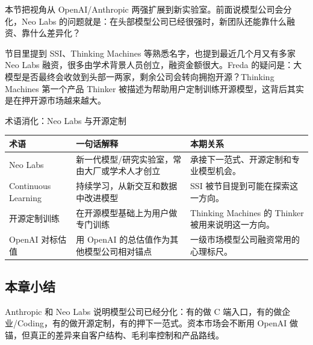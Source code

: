 本节把视角从 OpenAI/Anthropic 两强扩展到新实验室。前面说模型公司会分化，Neo Labs 的问题就是：在头部模型公司已经很强时，新团队还能靠什么融资、靠什么差异化？

节目里提到 SSI、Thinking Machines 等熟悉名字，也提到最近几个月又有多家 Neo Labs 融资，很多由学术背景人员创立，融资金额很大。Freda 的疑问是：大模型是否最终会收敛到头部一两家，剩余公司会转向拥抱开源？Thinking Machines 第一个产品 Thinker 被描述为帮助用户定制训练开源模型，这背后其实是在押开源市场越来越大。

\begin{knowledgebox}{术语消化：Neo Labs 与开源定制}
\begin{tabularx}{\textwidth}{p{}p{}X}
\toprule
术语 & 一句话解释 & 本期关系 \\
\midrule
Neo Labs & 新一代模型/研究实验室，常由大厂或学术人才创立 & 承接下一范式、开源定制和专业模型机会。 \\
Continuous Learning & 持续学习，从新交互和数据中改进模型 & SSI 被节目提到可能在探索这一方向。 \\
开源定制训练 & 在开源模型基础上为用户做专门训练 & Thinking Machines 的 Thinker 被用来说明这一方向。 \\
OpenAI 对标估值 & 用 OpenAI 的总估值作为其他模型公司相对锚点 & 一级市场模型公司融资常用的心理标尺。 \\
\bottomrule
\end{tabularx}
\end{knowledgebox}

\subsection{本章小结}

Anthropic 和 Neo Labs 说明模型公司已经分化：有的做 C 端入口，有的做企业/Coding，有的做开源定制，有的押下一范式。资本市场会不断用 OpenAI 做锚，但真正的差异来自客户结构、毛利率控制和产品路线。

